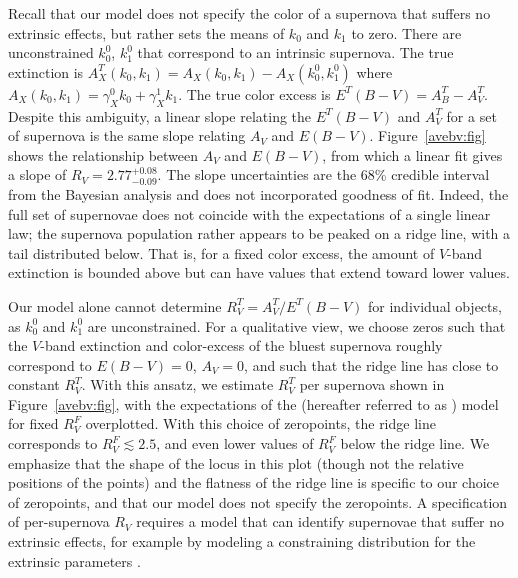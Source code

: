 \documentclass{aastex61}   	%
\begin{document}
\color{red}
Recall that our model does not specify the color of a supernova that suffers no extrinsic effects, but rather sets the
means of $k_0$ and $k_1$ to zero.
There are unconstrained $k_0^0$, $k_1^0$ that correspond to an intrinsic supernova.  The true extinction is
$A^T_X(k_0,k_1)= A_X(k_0,k_1) -  A_X(k^0_0,k^0_1)$ where $A_X(k_0,k_1) =  \gamma^0_X k_0 + \gamma^1_X k_1$.
The true color excess is $E^T(B-V) = A^T_B-A^T_V$.
Despite this ambiguity, a linear slope relating the $E^T(B-V)$ and $A^T_V$ for a set of supernova is the same slope
relating $A_V$ and $E(B-V)$.
\color{black}
Figure~\ref{avebv:fig} shows the relationship between $A_V$ and $E(B-V)$, from
which a linear fit gives a slope of $R_V=2.77^{+0.08}_{-0.09}$.
\color{red}
The slope uncertainties are the $68$\% credible interval from the Bayesian analysis and does not incorporated goodness
 of fit.  Indeed,
the full set of supernovae does not coincide with the expectations of a single linear law; the supernova population rather appears to be peaked
on a ridge line, with a tail distributed below.  That is, for a fixed color excess, the amount of $V$-band extinction is bounded above
but can have values that extend toward lower values.

\color{blue}
Our model alone cannot determine $R^T_V = A^T_V/E^T(B-V)$ for individual objects, as $k_0^0$ and $k_1^0$ are unconstrained.
For a qualitative view, we choose zeros  such that the $V$-band extinction and color-excess of the bluest supernova roughly correspond to $E(B-V)=0$,
$A_V=0$, and such that the ridge line 
has close to constant $R^T_V$.
\color{black}
With this ansatz, we
estimate $R^T_V$ per supernova shown in Figure~\ref{avebv:fig}, with the expectations of the
 \citet{1999PASP..111...63F} (hereafter referred to as )  model for fixed $R^F_V$ overplotted.
With this choice of zeropoints, the ridge line corresponds to $R_V^F\lesssim 2.5$, and even lower values of $R_V^F$ below the ridge line.
We emphasize that the shape of the locus in this plot (though not the relative positions of the points)  and the flatness
of the ridge line is specific to our choice of zeropoints, and that our model does not specify the zeropoints.
A specification of per-supernova $R_V$ requires a model that can identify supernovae that suffer no extrinsic effects,
for example by modeling  a constraining distribution for the extrinsic parameters \citep{2016arXiv160904470M}.
\color{black}
\end{document}
